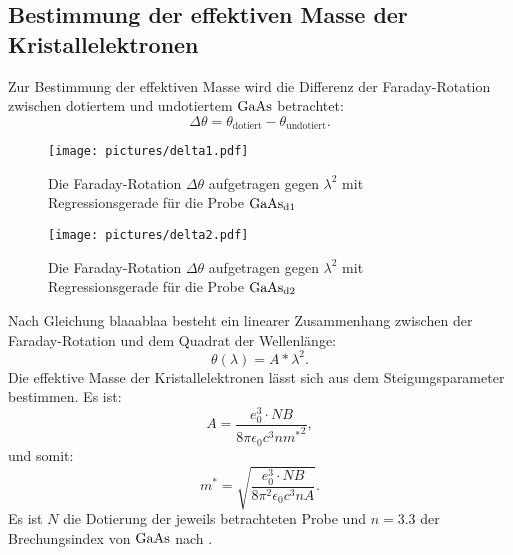 \subsection{Bestimmung der effektiven Masse der Kristallelektronen}
Zur Bestimmung der effektiven Masse wird die Differenz der Faraday-Rotation zwischen dotiertem und undotiertem $\ce{GaAs}$ betrachtet:
\begin{equation}
\Delta \theta=\theta_{\mathrm{dotiert}}-\theta_{\mathrm{undotiert}}\mathrm{.}
\end{equation}

\begin{figure}
  \centering
  \texttt{[image: pictures/delta1.pdf]}
  \caption{Die Faraday-Rotation $\Delta \theta$ aufgetragen gegen $\lambda^{2}$ mit Regressionsgerade für die Probe $\ce{GaAs}_{\mathrm{d1}}$}
  \label{fig:delta1}
\end{figure}
\begin{figure}
  \centering
  \texttt{[image: pictures/delta2.pdf]}
  \caption{Die Faraday-Rotation $\Delta \theta$ aufgetragen gegen $\lambda^{2}$ mit Regressionsgerade für die Probe $\ce{GaAs}_{\mathrm{d2}}$}
  \label{fig:delta2}
\end{figure}
Nach Gleichung blaaablaa besteht ein linearer Zusammenhang zwischen der Faraday-Rotation und dem Quadrat der Wellenlänge:
\begin{equation}
    \theta(\lambda)=A*\lambda^2 \mathrm{.}
\end{equation}
Die effektive Masse der Kristallelektronen lässt sich aus dem Steigungsparameter bestimmen.
Es ist:
\begin{equation}
  A=\frac{e_{\mathrm{0}}^3 \cdot NB}{8\pi \epsilon_{\mathrm{0}} c^3 n {m^{*}}^2}\mathrm{,}
\end{equation}
und somit:
\begin{equation}
  {m^{*}}=\sqrt{\frac{e_{\mathrm{0}}^3 \cdot NB}{8\pi^2 \epsilon_{\mathrm{0}} c^3 n A}}\mathrm{.}
\end{equation}
Es ist $N$ die Dotierung der jeweils betrachteten Probe und $n=3.3$ der Brechungsindex von $\ce{GaAs}$ nach \cite{ioffe}.
